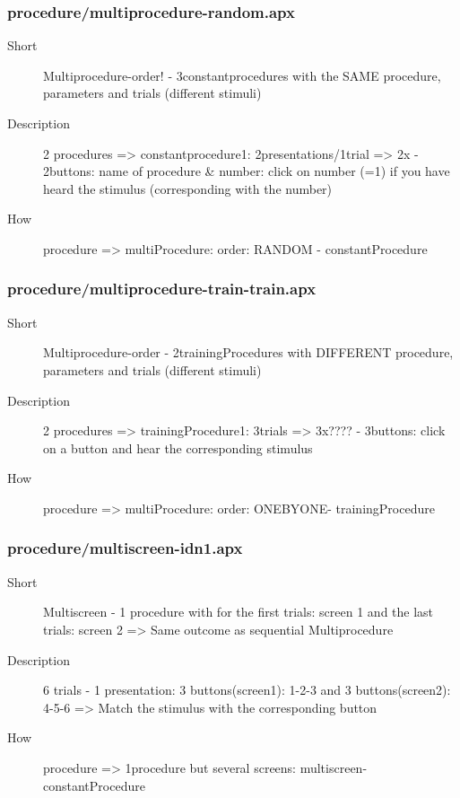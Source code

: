 \subsubsection{procedure/multiprocedure-random.apx}
\begin{description}
\item[Short] 
 Multiprocedure-order! - 3constantprocedures with the SAME procedure, parameters and trials (different stimuli)
\item[Description] 
 2 procedures =\textgreater{} constantprocedure1: 2presentations/1trial =\textgreater{} 2x - 2buttons: name of procedure \& number: click on number (=1) if you have heard the stimulus (corresponding with the number)
\item[How] 
 procedure =\textgreater{} multiProcedure: order: RANDOM - constantProcedure
\end{description}

\subsubsection{procedure/multiprocedure-train-train.apx}
\begin{description}
\item[Short] 
 Multiprocedure-order - 2trainingProcedures with DIFFERENT procedure, parameters and trials (different stimuli)
\item[Description] 
 2 procedures =\textgreater{} trainingProcedure1: 3trials =\textgreater{} 3x???? - 3buttons: click on a button and hear the corresponding stimulus
\item[How] 
 procedure =\textgreater{} multiProcedure: order: ONEBYONE- trainingProcedure
\end{description}

\subsubsection{procedure/multiscreen-idn1.apx}
\begin{description}
\item[Short] 
 Multiscreen - 1 procedure with for the first trials: screen 1 and the last trials: screen 2 =\textgreater{} Same outcome as sequential Multiprocedure
\item[Description] 
 6 trials - 1 presentation: 3 buttons(screen1): 1-2-3 and 3 buttons(screen2): 4-5-6 =\textgreater{} Match the stimulus with the corresponding button
\item[How] 
 procedure =\textgreater{} 1procedure but several screens: multiscreen- constantProcedure
\end{description}


